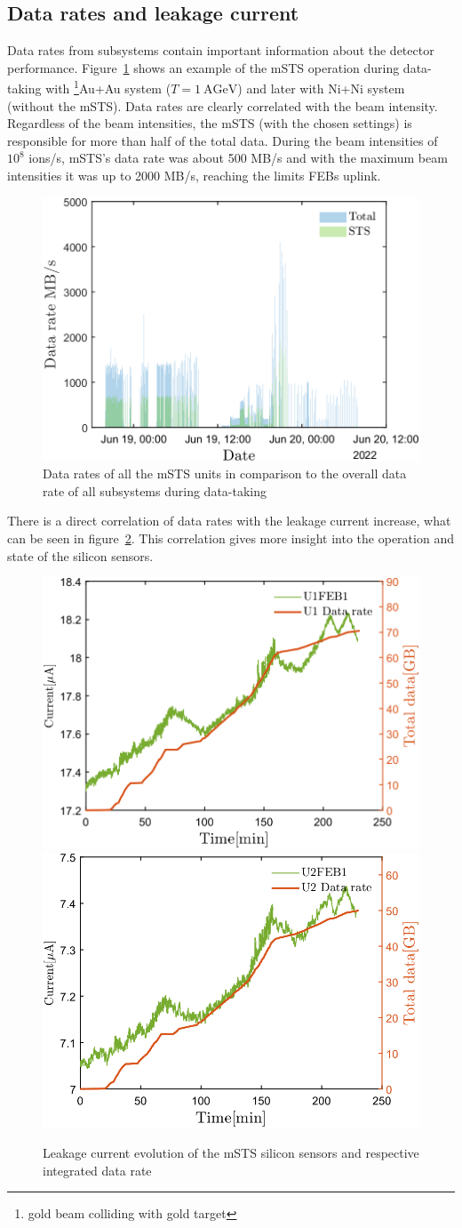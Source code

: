 \subsection{Data rates and leakage current}
Data rates from subsystems contain important information about the detector performance. Figure~\ref{fig_data_rates_Ag} shows an example of the \gls{mSTS} operation during data-taking with \footnote{gold beam colliding with gold target}{Au+Au} system ($T= 1~\mathrm{AGeV}$) and later with Ni+Ni system (without the \gls{mSTS}). Data rates are clearly correlated with the beam intensity. Regardless of the beam intensities, the \gls{mSTS} (with the chosen settings) is responsible for more than half of the total data. During the beam intensities of $10^{8}$ ions/s, \gls{mSTS}'s data rate was about 500 MB/s and with the maximum beam intensities it was up to 2000 MB/s, reaching the limits \gls{FEB}s uplink. 
\begin{figure}[H]
\centering
\includegraphics[width=0.55\columnwidth]{Chapter6/DCS/images/rates/Ag_total.png}
\caption{Data rates of all the \gls{mSTS} units in comparison to the overall data rate of all subsystems during data-taking}
\label{fig_data_rates_Ag}
\end{figure}
\newpage
There is a direct correlation of data rates with the leakage current increase, what can be seen in figure~\ref{fig_Data}. This correlation gives more insight into the operation and state of the silicon sensors.
\begin{figure}[!h]
\centering
\includegraphics[width=0.45\columnwidth]{Chapter6/DCS/images/U1_data_rate.png}
\includegraphics[width=0.45\columnwidth]{Chapter6/DCS/images/U2_data_rate.png}
\caption{Leakage current evolution of the \gls{mSTS} silicon sensors and respective integrated data rate}
\label{fig_Data}
\end{figure}

